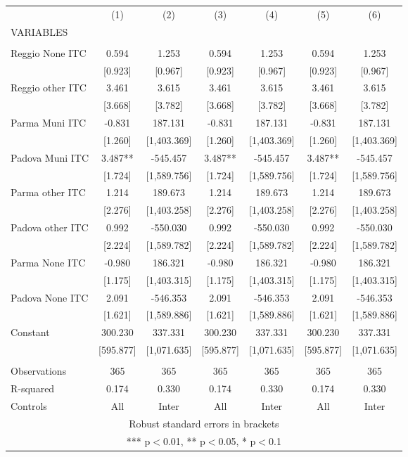 \begin{tabular}{lcccccc} \hline
 & (1) & (2) & (3) & (4) & (5) & (6) \\
VARIABLES &  &  &  &  &  &  \\ \hline
 &  &  &  &  &  &  \\
Reggio None ITC & 0.594 & 1.253 & 0.594 & 1.253 & 0.594 & 1.253 \\
 & [0.923] & [0.967] & [0.923] & [0.967] & [0.923] & [0.967] \\
Reggio other ITC & 3.461 & 3.615 & 3.461 & 3.615 & 3.461 & 3.615 \\
 & [3.668] & [3.782] & [3.668] & [3.782] & [3.668] & [3.782] \\
Parma Muni ITC & -0.831 & 187.131 & -0.831 & 187.131 & -0.831 & 187.131 \\
 & [1.260] & [1,403.369] & [1.260] & [1,403.369] & [1.260] & [1,403.369] \\
Padova Muni ITC & 3.487** & -545.457 & 3.487** & -545.457 & 3.487** & -545.457 \\
 & [1.724] & [1,589.756] & [1.724] & [1,589.756] & [1.724] & [1,589.756] \\
Parma other ITC & 1.214 & 189.673 & 1.214 & 189.673 & 1.214 & 189.673 \\
 & [2.276] & [1,403.258] & [2.276] & [1,403.258] & [2.276] & [1,403.258] \\
Padova other ITC & 0.992 & -550.030 & 0.992 & -550.030 & 0.992 & -550.030 \\
 & [2.224] & [1,589.782] & [2.224] & [1,589.782] & [2.224] & [1,589.782] \\
Parma None ITC & -0.980 & 186.321 & -0.980 & 186.321 & -0.980 & 186.321 \\
 & [1.175] & [1,403.315] & [1.175] & [1,403.315] & [1.175] & [1,403.315] \\
Padova None ITC & 2.091 & -546.353 & 2.091 & -546.353 & 2.091 & -546.353 \\
 & [1.621] & [1,589.886] & [1.621] & [1,589.886] & [1.621] & [1,589.886] \\
Constant & 300.230 & 337.331 & 300.230 & 337.331 & 300.230 & 337.331 \\
 & [595.877] & [1,071.635] & [595.877] & [1,071.635] & [595.877] & [1,071.635] \\
 &  &  &  &  &  &  \\
Observations & 365 & 365 & 365 & 365 & 365 & 365 \\
R-squared & 0.174 & 0.330 & 0.174 & 0.330 & 0.174 & 0.330 \\
 Controls & All & Inter & All & Inter & All & Inter \\ \hline
\multicolumn{7}{c}{ Robust standard errors in brackets} \\
\multicolumn{7}{c}{ *** p$<$0.01, ** p$<$0.05, * p$<$0.1} \\
\end{tabular}
